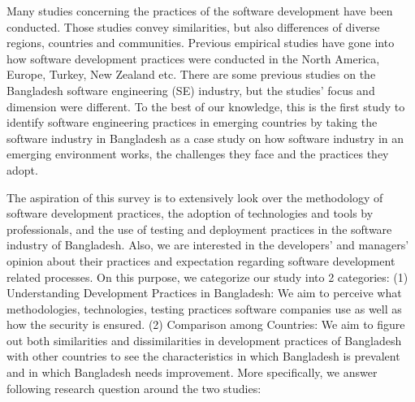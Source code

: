 Many studies concerning the practices of the software development have been conducted. Those studies convey similarities, but also differences of diverse regions, countries and communities. Previous empirical studies have gone into how software development practices were conducted in the North America, Europe, Turkey, New Zealand etc. There are some previous studies on the Bangladesh software engineering (SE) industry, but the studies' focus and dimension were different. To the best of our knowledge, this is the first study to identify software engineering practices in emerging countries by taking the software industry in Bangladesh as a case study on how software industry in an emerging environment works, the challenges they face and the practices they adopt.

The aspiration of this survey is to extensively look over the methodology of software development practices, the adoption of technologies and tools by professionals, and the use of testing and deployment practices in the software industry of Bangladesh. Also, we are interested in the developers' and managers' opinion about their practices and expectation regarding software development related processes. On this purpose, we categorize our study into 2 categories: (1) Understanding Development Practices in Bangladesh:  We aim to perceive what methodologies, technologies, testing practices software companies use as well as how the security is ensured. (2) Comparison among Countries: We aim to figure out both similarities and dissimilarities in development practices of Bangladesh with other countries to see the characteristics in which Bangladesh is prevalent and in which Bangladesh needs improvement. More specifically, we answer following research question around the two studies:

